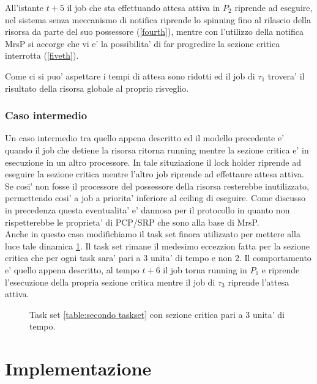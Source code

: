 \documentclass[a4paper,11pt]{article}
\begin{document}
\noindent All'istante $t + 5$ il job che sta effettuando attesa attiva in $P_2$ riprende ad eseguire, nel sistema senza meccanismo di notifica riprende lo spinning fino al rilascio della risorsa da parte del suo possessore (\ref{fourth}), mentre con l'utilizzo della notifica MrsP si accorge che vi e' la possibilita' di far progredire la sezione critica interrotta (\ref{fiveth}).

\noindent Come ci si puo' aspettare i tempi di attesa sono ridotti ed il job di $\tau_1$ trovera' il risultato della risorsa globale al proprio risveglio.

\subsubsection{Caso intermedio}

\noindent Un caso intermedio tra quello appena descritto ed il modello precedente e' quando il job che detiene la risorsa ritorna running mentre la sezione critica e' in esecuzione in un altro processore. In tale situziazione il lock holder riprende ad eseguire la sezione critica mentre l'altro job riprende ad effettaure attesa attiva. Se cosi' non fosse il processore del possessore della risorsa resterebbe inutilizzato, permettendo cosi' a job a priorita' inferiore al ceiling di eseguire. Come discusso in precedenza questa eventualita' e' dannosa per il protocollo in quanto non rispetterebbe le proprieta' di PCP/SRP che sono alla base di MrsP.\\

\noindent Anche in questo caso modifichiamo il task set finora utilizzato per mettere alla luce tale dinamica \ref{sixth}. Il task set rimane il medesimo eccezzion fatta per la sezione critica che per ogni task sara' pari a 3 unita' di tempo e non 2. Il comportamento e' quello appena descritto, al tempo $t + 6$ il job torna running in $P_1$ e riprende l'esecuzione della propria sezione critica mentre il job di $\tau_3$ riprende l'attesa attiva.\\


\begin{figure}
	\ModelloConcettualeSixth
	\caption{Task set \ref{table:secondo taskset} con sezione critica pari a 3 unita' di tempo.}
	\label{sixth}
\end{figure}

\newpage

\section{Implementazione}
\end{document}
